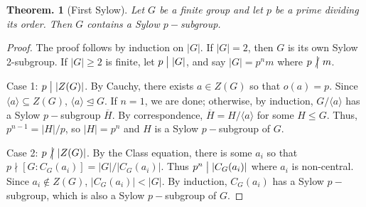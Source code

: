 \documentclass[11pt, a4paper]{memoir}
\renewcommand{\div}{\bigm|}
\newcommand{\ndiv}{%
    \mathrel{\mkern.5mu %
        \ooalign{\hidewidth$\big|$\hidewidth\cr$/$\cr}%
    }%
}
\theoremstyle{change}
\newtheorem{theorem}{Theorem.}[section]
\theoremstyle{plain}
\theoremstyle{nonumberplain}
\newtheorem{proof}{Proof}
\numberwithin{equation}{section}
\begin{document}
\begin{theorem}[First Sylow]
    Let $G$ be a finite group and let $p$ be a prime dividing its order.
    Then $G$ contains a Sylow $p-$subgroup.
\end{theorem}
\begin{proof}
    The proof follows by induction on $|G|$.
    If $|G|=2$, then $G$ is its own Sylow 2-subgroup.
    If $|G|\geq 2$ is finite, let $p\div|G|$, and say $|G|=p^nm$ where $p\ndiv m$.

    Case 1: $p\div|Z(G)|$.
    By Cauchy, there exists $a\in Z(G)$ so that $o(a)=p$.
    Since $\langle a\rangle\subseteq Z(G)$, $\langle a\rangle\trianglelefteq G$.
    If $n=1$, we are done; otherwise, by induction, $G/\langle a\rangle$ has a Sylow $p-$subgroup $\overline{H}$.
    By correspondence, $\overline{H}=H/\langle a\rangle$ for some $H\leq G$.
    Thus, $p^{n-1}=|H|/p$, so $|H|=p^n$ and $H$ is a Sylow $p-$subgroup of $G$.

    Case 2: $p\ndiv|Z(G)|$.
    By the Class equation, there is some $a_i$ so that $p\nmid[G:C_G(a_i)]=|G|/|C_G(a_i)|$.
    Thus $p^n\div|C_G(a_i)|$ where $a_i$ is non-central.
    Since $a_i\notin Z(G)$, $|C_G(a_i)|<|G|$.
    By induction, $C_G(a_i)$ has a Sylow $p-$subgroup, which is also a Sylow $p-$subgroup of $G$.
\end{proof}
\end{document}
